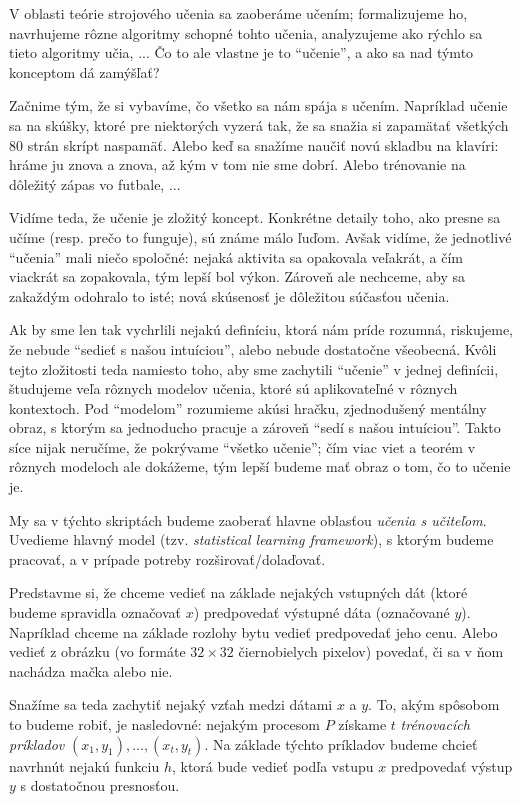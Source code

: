 
V oblasti teórie strojového učenia sa zaoberáme učením; formalizujeme ho,
navrhujeme rôzne algoritmy schopné tohto učenia, analyzujeme ako rýchlo
sa tieto algoritmy učia, ... Čo to ale vlastne je to ``učenie'', a ako sa
nad týmto konceptom dá zamýšľať?

Začnime tým, že si vybavíme, čo všetko sa nám spája s učením. Napríklad
učenie sa na skúšky, ktoré pre niektorých vyzerá tak, že sa snažia si
zapamätať všetkých $80$ strán skrípt naspamäť. Alebo keď sa snažíme
naučiť novú skladbu na klavíri: hráme ju znova a znova, až kým v tom
nie sme dobrí. Alebo trénovanie na dôležitý zápas vo futbale, ...

Vidíme teda, že učenie je zložitý koncept. Konkrétne detaily toho, ako
presne sa učíme (resp. prečo to funguje), sú známe málo ľuďom. Avšak
vidíme, že jednotlivé ``učenia'' mali niečo spoločné: nejaká aktivita
sa opakovala veľakrát, a čím viackrát sa zopakovala, tým lepší bol
výkon. Zároveň ale nechceme, aby sa zakaždým odohralo to isté; nová
skúsenosť je dôležitou súčasťou učenia.

Ak by sme len tak vychrlili nejakú definíciu, ktorá nám príde rozumná,
riskujeme, že nebude ``sedieť s našou intuíciou'', alebo nebude dostatočne
všeobecná. Kvôli tejto zložitosti teda namiesto toho, aby sme zachytili
``učenie'' v jednej definícii, študujeme veľa rôznych modelov učenia,
ktoré sú aplikovateľné v rôznych kontextoch. Pod ``modelom'' rozumieme
akúsi hračku, zjednodušený mentálny obraz, s ktorým sa jednoducho pracuje
a zároveň ``sedí s našou intuíciou''. Takto síce nijak neručíme, že pokrývame
``všetko učenie''; čím viac viet a teorém v rôznych modeloch ale dokážeme,
tým lepší budeme mať obraz o tom, čo to učenie je.

My sa v týchto skriptách budeme zaoberať hlavne oblasťou \emph{učenia s
učiteľom}. Uvedieme hlavný model (tzv. \emph{statistical learning framework}),
s ktorým budeme pracovať, a v prípade potreby rozširovať/dolaďovať.

Predstavme si, že chceme vedieť na základe nejakých vstupných dát (ktoré
budeme spravidla označovať $x$) predpovedať výstupné dáta (označované $y$).
Napríklad chceme na základe rozlohy bytu vedieť predpovedať jeho cenu.
Alebo vedieť z obrázku (vo formáte $32 \times 32$ čiernobielych pixelov)
povedať, či sa v ňom nachádza mačka alebo nie.

Snažíme sa teda zachytiť nejaký vzťah medzi dátami $x$ a $y$. To, akým
spôsobom to budeme robiť, je nasledovné: nejakým procesom $P$ získame $t$
\emph{trénovacích príkladov} $(x_1, y_1), \ldots, (x_t, y_t)$. Na základe
týchto príkladov budeme chcieť navrhnút nejakú funkciu $h$, ktorá bude
vedieť podľa vstupu $x$ predpovedať výstup $y$ s dostatočnou presnosťou.

